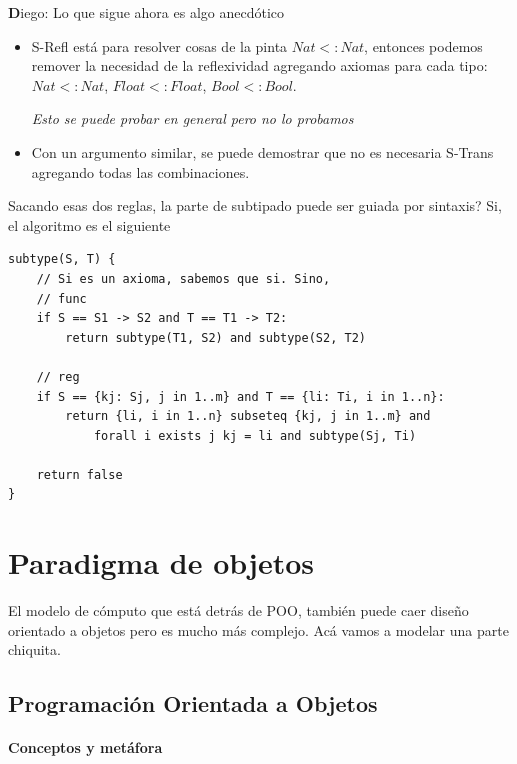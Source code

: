 \documentclass{report}
\theoremstyle{definition} %
\newenvironment{nota}[1]
    {\begin{leftbar}\textbf{#1}}
    {\end{leftbar}}
\newcommand{\subt}[2]{#1 <: #2}
\begin{document}
\begin{nota}
    Diego: Lo que sigue ahora es algo anecdótico
\end{nota}

\begin{itemize}
    \item S-Refl está para resolver cosas de la pinta $\subt{Nat}{Nat}$,
    entonces podemos remover la necesidad de la reflexividad agregando axiomas
    para cada tipo: $\subt{Nat}{Nat}$, $\subt{Float}{Float}$,
    $\subt{Bool}{Bool}$.

    \textit{Esto se puede probar en general pero no lo probamos}

    \item Con un argumento similar, se puede demostrar que no es necesaria
    S-Trans agregando todas las combinaciones.
\end{itemize}

Sacando esas dos reglas, la parte de subtipado puede ser guiada por sintaxis?
Si, el algoritmo es el siguiente

\begin{verbatim}
subtype(S, T) {
    // Si es un axioma, sabemos que si. Sino,
    // func
    if S == S1 -> S2 and T == T1 -> T2:
        return subtype(T1, S2) and subtype(S2, T2)
    
    // reg
    if S == {kj: Sj, j in 1..m} and T == {li: Ti, i in 1..n}:
        return {li, i in 1..n} subseteq {kj, j in 1..m} and
            forall i exists j kj = li and subtype(Sj, Ti)

    return false
}
\end{verbatim}

\chapter{Paradigma de objetos}

El modelo de cómputo que está detrás de POO, también puede caer diseño orientado
a objetos pero es mucho más complejo. Acá vamos a modelar una parte chiquita.

\section{Programación Orientada a Objetos}

\subsubsection{Conceptos y metáfora}
\end{document}

